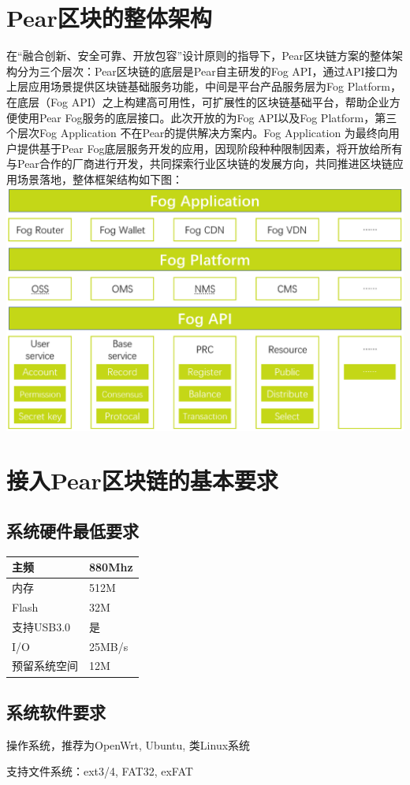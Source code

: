 \section{Pear区块的整体架构}
在“融合创新、安全可靠、开放包容”设计原则的指导下，Pear区块链方案的整体架构分为三个层次：Pear区块链的底层是Pear自主研发的Fog API，通过API接口为上层应用场景提供区块链基础服务功能，中间是平台产品服务层为Fog Platform，在底层（Fog API）之上构建高可用性，可扩展性的区块链基础平台，帮助企业方便使用Pear Fog服务的底层接口。此次开放的为Fog API以及Fog Platform，第三个层次Fog Application 不在Pear的提供解决方案内。Fog Application 为最终向用户提供基于Pear Fog底层服务开发的应用，因现阶段种种限制因素，将开放给所有与Pear合作的厂商进行开发，共同探索行业区块链的发展方向，共同推进区块链应用场景落地，整体框架结构如下图：
\includegraphics[width= 6.5 in]{frame.eps}



\section{接入Pear区块链的基本要求}
\subsection{系统硬件最低要求}
\begin{table}[!htb] 
\Large    
\begin{center}  
\begin{tabular}{|l|l|}  
\hline  
主频 & 880Mhz\\ \hline  
内存  & 512M \\ \hline  
Flash& 32M\\ \hline
支持USB3.0& 是 \\ \hline
I/O & 25MB/s \\ \hline
预留系统空间&12M \\ \hline
\end{tabular}  
\end{center}  
\end{table}  
\subsection{系统软件要求}
操作系统，推荐为OpenWrt, Ubuntu, 类Linux系统 \par 
支持文件系统：ext3/4, FAT32, exFAT 



